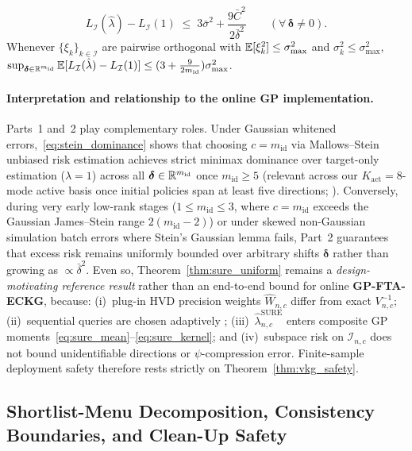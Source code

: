 \begin{theorem}
\begin{enumerate}
  \begin{equation}\label{eq:sure_uniform_path}
    L_{\mathcal{I}}(\hat{\lambda}) - L_{\mathcal{I}}(1) \;\le\; 3\bar{\sigma}^2 + \frac{9\bar{C}^2}{2\bar{\delta}^2}
    \qquad (\forall\, \bm{\delta} \neq 0).
  \end{equation}
  Whenever $\{\xi_k\}_{k \in \mathcal{I}}$ are pairwise orthogonal with $\mathbb{E}[\xi_k^2] \le \sigma_{\max}^2$ and $\sigma_k^2 \le \sigma_{\max}^2$, $\sup_{\bm{\delta} \in \mathbb{R}^{m_{\mathrm{id}}}} \mathbb{E}[L_{\mathcal{I}}(\hat{\lambda}) - L_{\mathcal{I}}(1)] \le (3 + \frac{9}{2 m_{\mathrm{id}}})\sigma_{\max}^2$.
\end{enumerate}
\end{theorem}

\paragraph{Interpretation and relationship to the online GP implementation.}
Parts~1 and~2 play complementary roles. Under Gaussian whitened errors,~\eqref{eq:stein_dominance} shows that choosing $c = m_{\mathrm{id}}$ via Mallows--Stein unbiased risk estimation achieves strict minimax dominance over target-only estimation ($\lambda = 1$) across all $\bm{\delta} \in \mathbb{R}^{m_{\mathrm{id}}}$ once $m_{\mathrm{id}} \ge 5$ (relevant across our $K_{\mathrm{act}} = 8$-mode active basis once initial policies span at least five directions; \citealp{james1961estimation,baranchik1970family}). Conversely, during very early low-rank stages ($1 \le m_{\mathrm{id}} \le 3$, where $c = m_{\mathrm{id}}$ exceeds the Gaussian James--Stein range $2(m_{\mathrm{id}}-2)$) or under skewed non-Gaussian simulation batch errors where Stein's Gaussian lemma fails, Part~2 guarantees that excess risk remains uniformly bounded over arbitrary shifts $\bm{\delta}$ rather than growing as $\propto \bar{\delta}^2$. Even so, Theorem~\ref{thm:sure_uniform} remains a \emph{design-motivating reference result} rather than an end-to-end bound for online \textbf{GP-FTA-ECKG}, because: (i)~plug-in HVD precision weights $\hat{W}_{n,c}$ differ from exact $V_{n,c}^{-1}$; (ii)~sequential queries are chosen adaptively \citep{deshpande2018accurate}; (iii)~$\hat{\lambda}_{n,c}^{\mathrm{SURE}}$ enters composite GP moments~\eqref{eq:sure_mean}--\eqref{eq:sure_kernel}; and (iv)~subspace risk on $\mathcal{I}_{n,c}$ does not bound unidentifiable directions or $\psi$-compression error. Finite-sample deployment safety therefore rests strictly on Theorem~\ref{thm:vkg_safety}.

\subsection{Shortlist-Menu Decomposition, Consistency Boundaries, and Clean-Up Safety}\label{sec:cascade_value}

